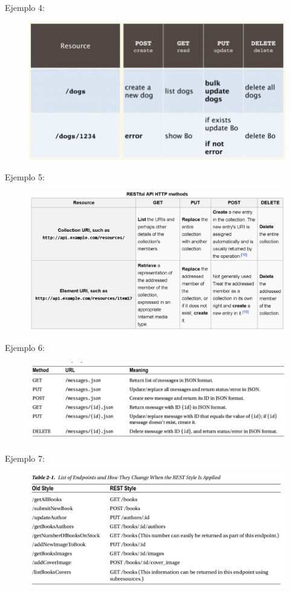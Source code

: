 \documentclass[4paper]{article}
\begin{document}
\newpage
Ejemplo 4:
\begin{figure}[H]
\includegraphics[scale=0.9]{../imagenes/api_rest2.png}
\end{figure}
Ejemplo 5:
\begin{figure}[H]
\includegraphics[scale=0.4]{../imagenes/api_rest3.png}
\end{figure}
\newpage
Ejemplo 6:
\begin{figure}[H]
\includegraphics[scale=0.7]{../imagenes/api_rest4.png}
\end{figure}
Ejemplo 7:
\begin{figure}[H]
\includegraphics[scale=0.5]{../imagenes/api_rest5.png}
\end{figure}
\newpage
\end{document}
